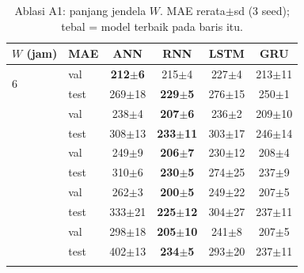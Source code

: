 \begin{table}[t]
\centering
\scriptsize
\caption{Ablasi A1: panjang jendela $W$. MAE rerata$\pm$sd (3 seed); tebal = model terbaik pada baris itu.}
\label{tab:A1}
\setlength{\tabcolsep}{3pt}
\begin{tabular}{@{}llcccc@{}}
\toprule
$W$ (jam) & MAE & ANN & RNN & LSTM & GRU \\
\midrule
\multirow{2}{*}{6} & val & \textbf{212$\pm$6} & 215$\pm$4 & 227$\pm$4 & 213$\pm$11 \\
 & test & 269$\pm$18 & \textbf{229$\pm$5} & 276$\pm$15 & 250$\pm$1 \\
\addlinespace[1pt]
\multirow{2}{*}{12} & val & 238$\pm$4 & \textbf{207$\pm$6} & 236$\pm$2 & 209$\pm$10 \\
 & test & 308$\pm$13 & \textbf{233$\pm$11} & 303$\pm$17 & 246$\pm$14 \\
\addlinespace[1pt]
\multirow{2}{*}{24} & val & 249$\pm$9 & \textbf{206$\pm$7} & 230$\pm$12 & 208$\pm$4 \\
 & test & 310$\pm$6 & \textbf{230$\pm$5} & 274$\pm$25 & 237$\pm$9 \\
\addlinespace[1pt]
\multirow{2}{*}{48} & val & 262$\pm$3 & \textbf{200$\pm$5} & 249$\pm$22 & 207$\pm$5 \\
 & test & 333$\pm$21 & \textbf{225$\pm$12} & 304$\pm$27 & 237$\pm$11 \\
\addlinespace[1pt]
\multirow{2}{*}{168} & val & 298$\pm$18 & \textbf{205$\pm$10} & 241$\pm$8 & 207$\pm$5 \\
 & test & 402$\pm$13 & \textbf{234$\pm$5} & 293$\pm$20 & 237$\pm$11 \\
\addlinespace[1pt]
\bottomrule
\end{tabular}
\end{table}
